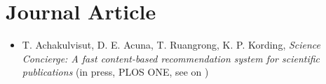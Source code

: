 \section{\sc Journal Article}

\begin{itemize}[leftmargin=0cm, label={}]

\item T. Achakulvisut, D. E. Acuna, T. Ruangrong, K. P. Kording, {\em Science Concierge: A fast content-based recommendation system for scientific publications}
(in press, PLOS ONE, see on \href{https://github.com/titipata/science_concierge}{\faGithubAlt})

\end{itemize}
